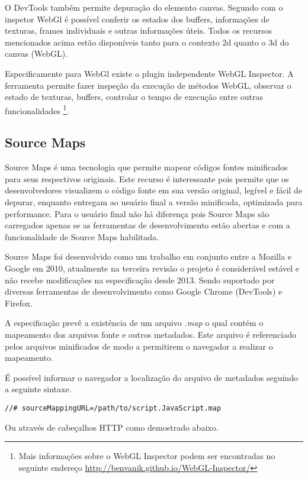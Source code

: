 O DevTools também permite depuração do elemento canvas. Segundo
\cite{html5mostwanted} com o inspetor WebGl é possível conferir os
estados dos buffers, informações de texturas, frames individuais e
outras informações úteis. Todos os recursos mencionados acima estão
disponíveis tanto para o contexto 2d quanto o 3d do canvas (WebGL).

Especificamente para WebGl existe o plugin independente WebGL Inspector.
A ferramenta permite fazer inspeção da execução de métodos
WebGL, observar o estado de texturas, buffers, controlar o tempo de
execução entre outras funcionalidades \footnote{Mais informações
sobre o WebGL Inspector podem ser encontradas no seguinte endereço
\url{http://benvanik.github.io/WebGL-Inspector/}}.

\subsection{Source Maps}

Source Maps é uma tecnologia que permite mapear códigos fontes
minificados para seus respectivos originais. Este recurso é
interessante pois permite que os desenvolvedores visualizem o código
fonte em sua versão original, legível e fácil de depurar, enquanto
entregam ao usuário final a versão minificada, optimizada para
performance. Para o usuário final não há diferença pois Source Maps
são carregados apenas se as ferramentas de desenvolvimento estão
abertas e com a funcionalidade de Source Maps habilitada.

Source Maps foi desenvolvido como um trabalho em conjunto entre a
Mozilla e Google em 2010, atualmente na terceira revisão o projeto é
considerável estável e não recebe modificações na especificação
desde 2013. Sendo suportado por diversas ferramentas de desenvolvimento
como Google Chrome (DevTools) e Firefox.

A especificação prevê a existência de um arquivo \textit{.map} o
qual contém o mapeamento dos arquivos fonte e outros metadados. Este
arquivo é referenciado pelos arquivos minificados de modo a permitirem
o navegador a realizar o mapeamento.

É possível informar o navegador a localização do arquivo de metadados
seguindo a seguinte sintaxe.

\begin{verbatim}
//# sourceMappingURL=/path/to/script.JavaScript.map
\end{verbatim}

Ou através de cabeçalhos HTTP como demostrado abaixo.


